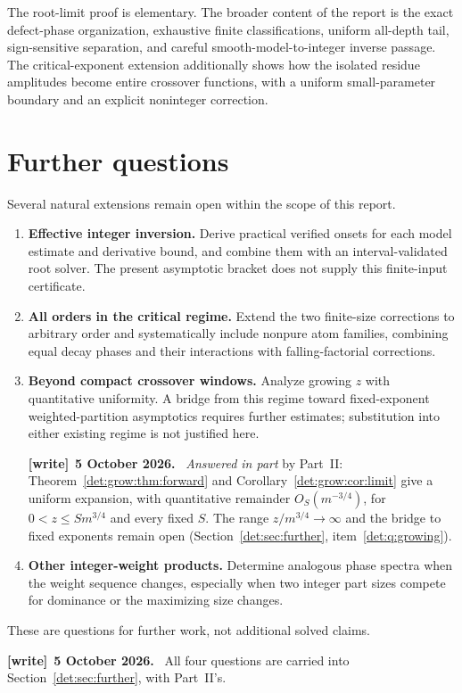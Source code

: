 \documentclass[11pt,letterpaper]{article}
\numberwithin{equation}{section}
\theoremstyle{definition}\newtheorem{definition}[theorem]{Definition}
\theoremstyle{remark}\newtheorem{remark}[theorem]{Remark}
\newenvironment{writenote}[1][]{\par\smallskip\begingroup\small
 \noindent\textbf{[write]}\if\relax\detokenize{#1}\relax\else~\textbf{#1.}\fi\ }%
 {\par\endgroup\smallskip}
\begin{document}
The root-limit proof is elementary. The broader content of the report is
the exact defect-phase organization, exhaustive finite classifications,
uniform all-depth tail, sign-sensitive separation, and careful
smooth-model-to-integer inverse passage. The critical-exponent extension additionally shows how the isolated
residue amplitudes become entire crossover functions, with a uniform
small-parameter boundary and an explicit noninteger correction.

\section{Further questions}\label{det:dia:sec:further}
Several natural extensions remain open within the scope of this report.
\begin{enumerate}
\item \textbf{Effective integer inversion.} Derive practical verified
onsets for each model estimate and derivative bound, and combine them
with an interval-validated root solver. The present asymptotic bracket
does not supply this finite-input certificate.
\item \textbf{All orders in the critical regime.} Extend the two
finite-size corrections to arbitrary order and systematically include
nonpure atom families, combining equal decay phases and their
interactions with falling-factorial corrections.
\item \textbf{Beyond compact crossover windows.} Analyze growing $z$
with quantitative uniformity. A bridge from this regime toward
fixed-exponent weighted-partition asymptotics requires further estimates;
substitution into either existing regime is not justified here.
\begin{writenote}[5 October 2026]
\emph{Answered in part} by Part~II: Theorem~\ref{det:grow:thm:forward} and Corollary~\ref{det:grow:cor:limit} give a uniform expansion, with quantitative remainder $O_S(m^{-3/4})$, for $0<z\le Sm^{3/4}$ and every fixed $S$. The range $z/m^{3/4}\to\infty$ and the bridge to fixed exponents remain open (Section~\ref{det:sec:further}, item~\ref{det:q:growing}).
\end{writenote}
\item \textbf{Other integer-weight products.} Determine analogous
phase spectra when the weight sequence changes, especially when two
integer part sizes compete for dominance or the maximizing size changes.
\end{enumerate}
These are questions for further work, not additional solved claims.
\begin{writenote}[5 October 2026]
All four questions are carried into Section~\ref{det:sec:further}, with Part~II's.
\end{writenote}
\end{document}
